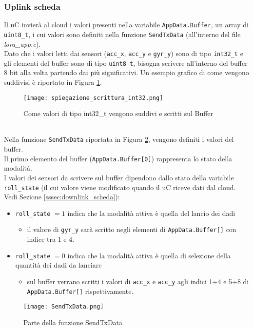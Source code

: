   \subsubsection{Uplink scheda}\label{sssec:uplink_scheda}
  Il uC invierà al cloud i valori presenti nella variabile \Verb|AppData.Buffer|, un array di \Verb|uint8_t|, i cui valori sono definiti nella funzione \Verb|SendTxData| (all'interno del file \textit{lora\_app.c}).
  \\Dato che i valori letti dai sensori (\Verb|acc_x|, \Verb|acc_y| e \Verb|gyr_y|) sono di tipo \Verb|int32_t| e gli elementi del buffer sono di tipo \Verb|uint8_t|, bisogna scrivere all'interno del buffer 8 bit alla volta partendo dai più significativi. Un esempio grafico di come vengono suddivisi è riportato in Figura \ref{fig:int32tobuffer}.
  \begin{figure}[h!]
    \centering
    \texttt{[image: spiegazione\_scrittura\_int32.png]}
    \caption{Come valori di tipo int32\_t vengono suddivi e scritti sul Buffer}
    \label{fig:int32tobuffer}
  \end{figure}
  \\Nella funzione \Verb|SendTxData| riportata in Figura \ref{fig:sendtxdata}, vengono definiti i valori del buffer.
  \\Il primo elemento del buffer (\Verb|AppData.Buffer[0]|) rappresenta lo stato della modalità.
  \\I valori dei sensori da scrivere sul buffer dipendono dallo stato della variabile \Verb|roll_state| (il cui valore viene modificato quando il uC riceve dati dal cloud. Vedi Sezione \ref{sssec:downlink_scheda}):
  \begin{itemize}
    \item \Verb|roll_state| $=1$ indica che la modalità attiva è quella del lancio dei dadi
          \begin{itemize}
            \item il valore di \Verb|gyr_y| sarà scritto negli elementi di \Verb|AppData.Buffer[]| con indice tra 1 e 4.
          \end{itemize}
    \item \Verb|roll_state| $=0$ indica che la modalità attiva è quella di selezione della quantità dei dadi da lanciare
          \begin{itemize}
            \item sul buffer verrano scritti i valori di \Verb|acc_x| e \Verb|acc_y| agli indici 1$\div$4 e 5$\div$8 di \Verb|AppData.Buffer[]| rispettivamente.
          \end{itemize}
  \end{itemize}
  \begin{figure}[h!]
    \centering
    \texttt{[image: SendTxData.png]}
    \caption{Parte della funzione SendTxData}
    \label{fig:sendtxdata}
  \end{figure}

